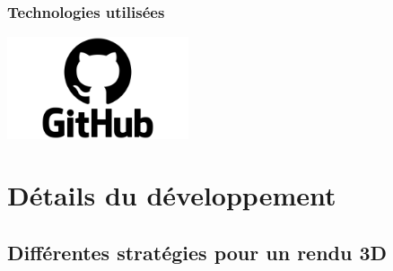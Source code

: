 \documentclass{beamer}
\begin{document}
\begin{frame}
    \frametitle{Technologies utilisées}
    

    \hspace{5mm}
    \hspace{-1mm}
    \hspace{-15mm}
    \includegraphics[width=0.40\textwidth]{images/github.png}
\end{frame}

\section{Détails du développement}
\subsection{Différentes stratégies pour un rendu 3D}
\end{document}
